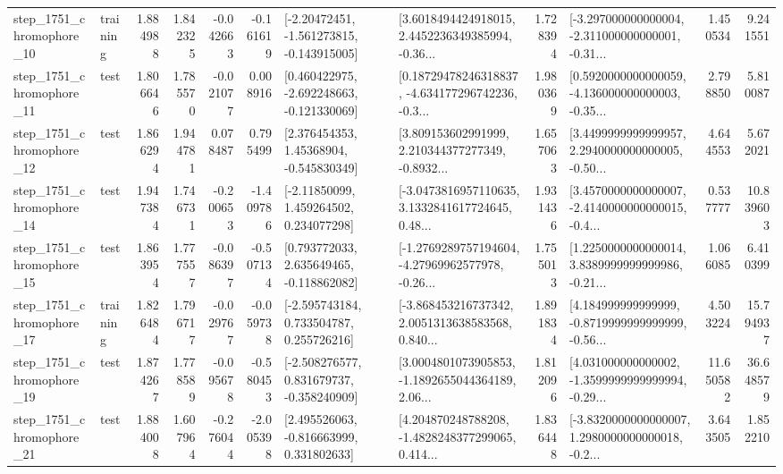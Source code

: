 \begin{tabular}{llrrrrllrlrr}
 step\_1751\_chromophore\_10 &  training &      1.884988 &    1.842325 &     -0.042663 & -0.161619 &   [-2.20472451, -1.561273815, -0.143915005] &  [3.6018494424918015, 2.4452236349385994, -0.36... &       1.728394 &  [-3.297000000000004, -2.311000000000001, -0.31... &            1.450534 &          9.241551 \\
 step\_1751\_chromophore\_11 &      test &      1.806646 &    1.785570 &     -0.021077 &  0.008916 &   [0.460422975, -2.692248663, -0.121330069] &  [0.18729478246318837, -4.634177296742236, -0.3... &       1.980369 &  [0.5920000000000059, -4.136000000000003, -0.35... &            2.798850 &          5.810087 \\
 step\_1751\_chromophore\_12 &      test &      1.866294 &    1.944781 &      0.078487 &  0.795499 &     [2.376454353, 1.45368904, -0.545830349] &  [3.809153602991999, 2.210344377277349, -0.8932... &       1.657063 &  [3.4499999999999957, 2.2940000000000005, -0.50... &            4.644553 &          5.672021 \\
 step\_1751\_chromophore\_14 &      test &      1.947384 &    1.746731 &     -0.200653 & -1.409786 &     [-2.11850099, 1.459264502, 0.234077298] &  [-3.0473816957110635, 3.1332841617724645, 0.48... &       1.931436 &  [3.4570000000000007, -2.4140000000000015, -0.4... &            0.537777 &         10.839603 \\
 step\_1751\_chromophore\_15 &      test &      1.863954 &    1.777557 &     -0.086397 & -0.507134 &    [0.793772033, 2.635649465, -0.118862082] &  [-1.2769289757194604, -4.27969962577978, -0.26... &       1.755013 &  [1.2250000000000014, 3.8389999999999986, -0.21... &            1.066085 &          6.410399 \\
 step\_1751\_chromophore\_17 &  training &      1.826484 &    1.796717 &     -0.029767 & -0.059738 &    [-2.595743184, 0.733504787, 0.255726216] &  [-3.868453216737342, 2.0051313638583568, 0.840... &       1.891834 &  [4.184999999999999, -0.8719999999999999, -0.56... &            4.503224 &         15.794937 \\
 step\_1751\_chromophore\_19 &      test &      1.874267 &    1.778589 &     -0.095678 & -0.580453 &   [-2.508276577, 0.831679737, -0.358240909] &  [3.0004801073905853, -1.1892655044364189, 2.06... &       1.812096 &  [4.031000000000002, -1.3599999999999994, -0.29... &           11.650582 &         36.648579 \\
 step\_1751\_chromophore\_21 &      test &      1.884008 &    1.607964 &     -0.276044 & -2.005398 &    [2.495526063, -0.816663999, 0.331802633] &  [4.204870248788208, -1.4828248377299065, 0.414... &       1.836448 &  [-3.8320000000000007, 1.2980000000000018, -0.2... &            3.643505 &          1.852210 \\

\end{tabular}
